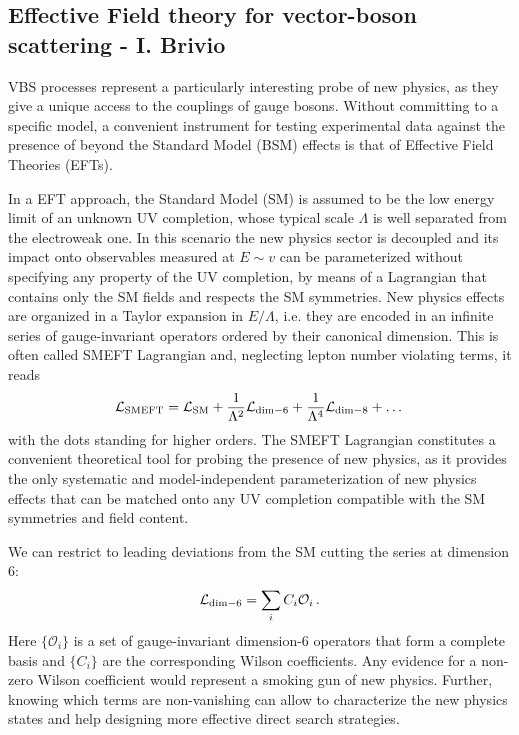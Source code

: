 \subsection{Effective Field theory for vector-boson scattering - I. Brivio}
VBS processes represent a particularly interesting probe of new physics, as they give a unique access to the couplings of gauge bosons.
Without committing to a specific model, a convenient instrument for testing experimental data against the presence of beyond the Standard Model (BSM) effects is that of Effective Field Theories (EFTs).

In a EFT approach, the Standard Model (SM) is assumed to be the low energy limit of an unknown UV completion, whose typical scale $\Lambda$ is well separated from the electroweak one. In this scenario the new physics sector is decoupled and its impact onto observables measured at $E\sim v$ can be parameterized without specifying any property of the UV completion, by means of a Lagrangian that contains only the SM fields and respects the SM symmetries. New physics effects are organized in a Taylor expansion in $E/\Lambda$, i.e. they are encoded in an infinite series of gauge-invariant operators ordered by their canonical dimension.
This is often called SMEFT Lagrangian and, neglecting lepton number violating terms, it reads
\begin{equation}
 \mathcal{L}_{\rm SMEFT} = \mathcal{L}_{\rm SM} + \frac{1}{\Lambda^2}\mathcal{L}_{\rm dim-6} + \frac{1}{\Lambda^4}\mathcal{L}_{\rm dim-8} + \dots
\end{equation} 
with the dots standing for higher orders.
The SMEFT Lagrangian constitutes a convenient theoretical tool for probing the presence of new physics, as it provides the only systematic and model-independent parameterization of new physics effects that can be matched onto any UV completion compatible with the SM symmetries and field content.

We can restrict to leading deviations from the SM cutting the series at dimension 6:
\begin{equation}
 \mathcal{L}_{\rm dim-6} = \sum_i C_i \mathcal{O}_i\,.
\end{equation} 
Here $\{\mathcal{O}_i\}$ is a set of gauge-invariant dimension-6 operators that form a complete basis and $\{C_i\}$ are the corresponding Wilson coefficients.
%
Any evidence for a non-zero Wilson coefficient would represent a smoking gun of new physics. Further, knowing which terms are non-vanishing can allow to characterize the new physics states and help designing more effective direct search strategies.



